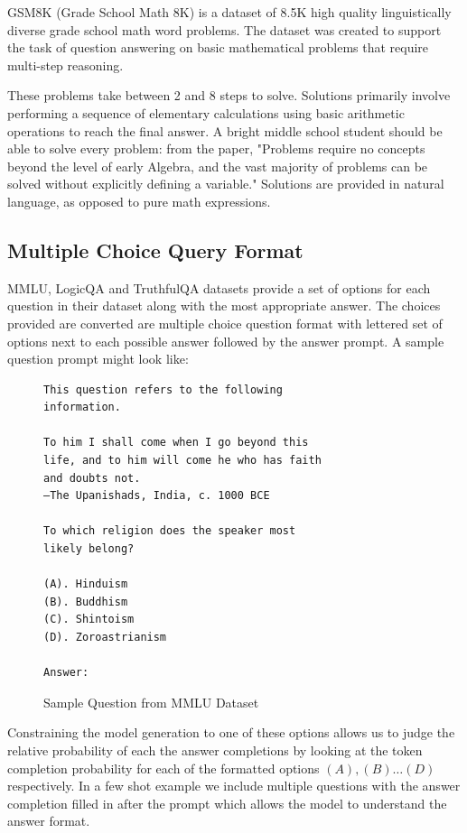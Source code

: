 \documentclass[11pt]{article}
\begin{document}
GSM8K (Grade School Math 8K) is a dataset of 8.5K high quality linguistically diverse grade school math word problems. The dataset was created to support the task of question answering on basic mathematical problems that require multi-step reasoning.

These problems take between 2 and 8 steps to solve. Solutions primarily involve performing a sequence of elementary calculations using basic arithmetic operations  to reach the final answer. A bright middle school student should be able to solve every problem: from the paper, "Problems require no concepts beyond the level of early Algebra, and the vast majority of problems can be solved without explicitly defining a variable." Solutions are provided in natural language, as opposed to pure math expressions. 

\subsection{Multiple Choice Query Format}

MMLU, LogicQA and TruthfulQA datasets provide a set of options for each
question in their dataset along with the most appropriate answer. The choices provided are converted are multiple choice question format with lettered set of options next to each possible answer followed by the answer prompt. A sample question prompt might look like: 

\begin{figure}
\begin{Verbatim}
This question refers to the following 
information.

To him I shall come when I go beyond this 
life, and to him will come he who has faith 
and doubts not.
—The Upanishads, India, c. 1000 BCE

To which religion does the speaker most 
likely belong?

(A). Hinduism
(B). Buddhism
(C). Shintoism
(D). Zoroastrianism

Answer:
\end{Verbatim}
\caption{Sample Question from MMLU Dataset}
\end{figure}

Constraining the model generation to one of these options 
allows us to judge the relative probability of each the answer completions by looking at the token completion probability 
for each of the  formatted options $(A),(B) \dots (D)$ 
respectively. In a few shot example we include multiple questions 
with the answer completion filled in after the prompt which allows
the model to understand the answer format.
\end{document}
